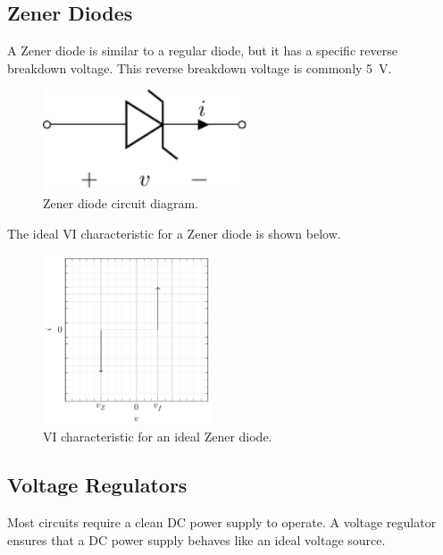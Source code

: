 \documentclass{article}
\begin{document}
\subsection{Zener Diodes}
A Zener diode is similar to a regular diode, but it has a specific
reverse breakdown voltage. This reverse breakdown voltage is commonly
\qty{5}{V}.
\begin{figure}[H]
    \centering
    \includegraphics[height = 3cm, keepaspectratio = true]{figures/zener_diode.pdf}
    \caption{Zener diode circuit diagram.}
\end{figure}
The ideal VI characteristic for a Zener diode is shown below.
\begin{figure}[H]
    \centering
    \includegraphics[height = 5cm, keepaspectratio = true]{figures/vi_characteristic_zener_diode.pdf}
    \caption{VI characteristic for an ideal Zener diode.}
\end{figure}
\subsection{Voltage Regulators}
Most circuits require a clean DC power supply to operate. A voltage
regulator ensures that a DC power supply behaves like an ideal voltage
source.
\end{document}
